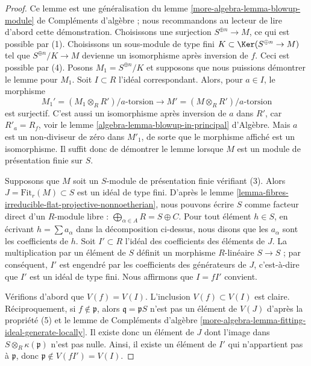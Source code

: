 \begin{proof}
Ce lemme est une généralisation du
lemme \ref{more-algebra-lemma-blowup-module} de Compléments d'algèbre ;
nous recommandons au lecteur de lire d'abord cette démonstration.
Choisissons une surjection $S^{\oplus n} \to M$, ce qui est possible par (1).
Choisissons un sous-module de type fini $K \subset \Ker(S^{\oplus n} \to M)$
tel que $S^{\oplus n}/K \to M$ devienne un isomorphisme après inversion de $f$.
Ceci est possible par (4). Posons $M_1 = S^{\oplus n}/K$ et supposons que nous puissions
démontrer le lemme pour $M_1$. Soit $I \subset R$ l'idéal correspondant.
Alors, pour $a \in I$, le morphisme
$$
M_1' = (M_1 \otimes_R R')/a\text{-torsion}
\longrightarrow
M' = (M \otimes_R R')/a\text{-torsion}
$$
est surjectif. C'est aussi un isomorphisme après inversion de $a$ dans $R'$,
car $R'_a = R_f$, voir le lemme \ref{algebra-lemma-blowup-in-principal} d'Algèbre.
Mais $a$ est un non-diviseur de zéro dans $M'_1$, de sorte que le morphisme affiché est un
isomorphisme. Il suffit donc de démontrer le lemme lorsque $M$ est un module
de présentation finie sur $S$.

\medskip\noindent
Supposons que $M$ soit un $S$-module de présentation finie vérifiant (3).
Alors $J = \text{Fit}_r(M) \subset S$ est un idéal de type fini.
D'après le lemme \ref{lemma-fibres-irreducible-flat-projective-nonnoetherian},
nous pouvons écrire $S$ comme facteur direct d'un
$R$-module libre : $\bigoplus_{\alpha \in A} R = S \oplus C$.
Pour tout élément $h \in S$, en écrivant $h = \sum a_\alpha$ dans la
décomposition ci-dessus, nous disons que les $a_\alpha$ sont les coefficients de $h$.
Soit $I' \subset R$ l'idéal des coefficients
des éléments de $J$. La multiplication par un élément de $S$ définit
un morphisme $R$-linéaire $S \to S$ ; par conséquent, $I'$ est engendré par les coefficients
des générateurs de $J$, c'est-à-dire que $I'$ est un idéal de type fini.
Nous affirmons que $I = fI'$ convient.

\medskip\noindent
Vérifions d'abord que $V(f) = V(I)$. L'inclusion $V(f) \subset V(I)$ est
claire. Réciproquement, si $f \not \in \mathfrak p$, alors
$\mathfrak q =  \mathfrak p S$ n'est pas un élément de $V(J)$ d'après la
propriété (5) et le lemme de Compléments d'algèbre
\ref{more-algebra-lemma-fitting-ideal-generate-locally}.
Il existe donc un
élément de $J$ dont l'image dans $S \otimes_R \kappa(\mathfrak p)$ n'est pas nulle.
Ainsi, il existe un élément de $I'$ qui n'appartient pas à
$\mathfrak p$, donc $\mathfrak p \not \in V(fI') = V(I)$.


\end{proof}

